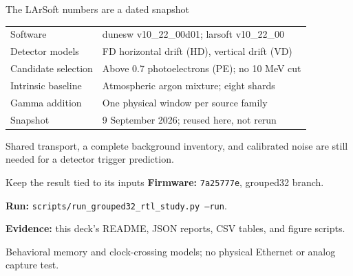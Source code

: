 \begin{frame}{The LArSoft numbers are a dated snapshot}
  \small
  \begin{tabular}{@{}ll@{}}
  \toprule
  Software & dunesw v10\_22\_00d01; larsoft v10\_22\_00 \\
  Detector models & FD horizontal drift (HD), vertical drift (VD) \\
  Candidate selection & Above 0.7 photoelectrons (PE); no 10 MeV cut \\
  Intrinsic baseline & Atmospheric argon mixture; eight shards \\
  Gamma addition & One physical window per source family \\
  Snapshot & 9 September 2026; reused here, not rerun \\
  \bottomrule
  \end{tabular}\par\medskip
  Shared transport, a complete background inventory, and calibrated noise are still needed for a detector trigger prediction.
\end{frame}

\begin{frame}{Keep the result tied to its inputs}
  \small
  \textbf{Firmware:} \texttt{7a25777e}, grouped32 branch.\par\medskip
  \textbf{Run:} \texttt{scripts/run\_grouped32\_rtl\_study.py --run}.\par\medskip
  \textbf{Evidence:} this deck's README, JSON reports, CSV tables, and figure scripts.\par\medskip
  Behavioral memory and clock-crossing models; no physical Ethernet or analog capture test.
\end{frame}
